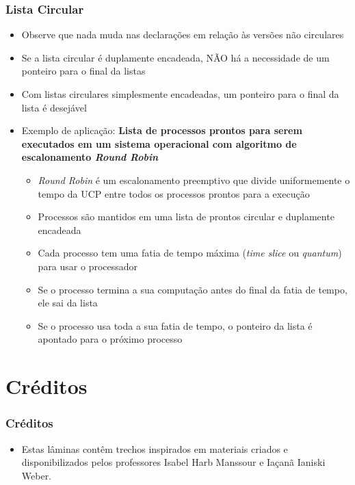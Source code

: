 \documentclass[aspectratio=169]{beamer}
\begin{document}
\begin{frame}[fragile]\frametitle{Lista Circular}
\begin{itemize}
	\item Observe que nada muda nas declarações em relação às versões não circulares
	\item Se a lista circular é duplamente encadeada, NÃO há a necessidade de um ponteiro para o final da listas
	\item Com listas circulares simplesmente encadeadas, um ponteiro para o final da lista é desejável
	\item Exemplo de aplicação: \textbf{Lista de processos prontos para serem executados em um sistema operacional com algoritmo de escalonamento \emph{Round Robin}}
	\begin{itemize}
		\item \emph{Round Robin} é um escalonamento preemptivo que divide uniformemente o tempo da UCP entre todos os processos prontos para a execução
		\item Processos são mantidos em uma lista de prontos circular e duplamente encadeada
		\item Cada processo tem uma fatia de tempo máxima (\emph{time slice} ou \emph{quantum}) para usar o processador
		\item Se o processo termina a sua computação antes do final da fatia de tempo, ele sai da lista
		\item Se o processo usa toda a sua fatia de tempo, o ponteiro da lista é apontado para o próximo processo
	\end{itemize}
\end{itemize}
\end{frame}

\section{Créditos}

\begin{frame}\frametitle{Créditos}
\begin{itemize}
	\item Estas lâminas contêm trechos inspirados em materiais criados e disponibilizados pelos professores Isabel Harb Manssour e Iaçanã Ianiski Weber.
\end{itemize}
\end{frame}
\end{document}
